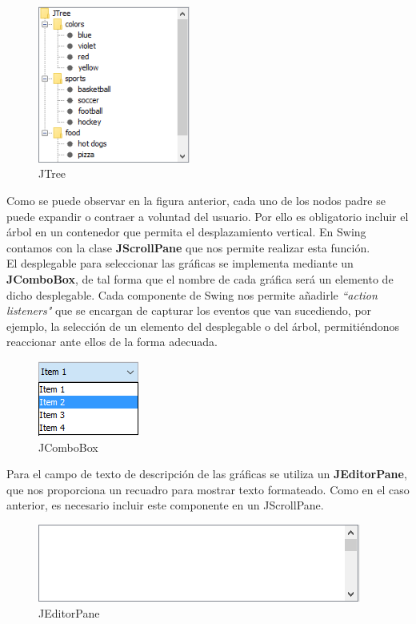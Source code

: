 \documentclass[12pt, a4paper]{article}
\begin{document}
\begin{figure}[htbp]
	\centering
	\includegraphics[width=5cm]{figuras/JTree.PNG}
	\caption{JTree}
	\label{fig:JTree}
	\end {figure}

Como se puede observar en la figura anterior, cada uno de los nodos padre se puede expandir o contraer a voluntad del usuario. Por ello es obligatorio incluir el árbol en un contenedor que permita el desplazamiento vertical. En Swing contamos con la clase \textbf{JScrollPane} que nos permite realizar esta función.
\\

El desplegable para seleccionar las gráficas se implementa mediante un \textbf{JComboBox}, de tal forma que el nombre de cada gráfica será un elemento de dicho desplegable. Cada componente de Swing nos permite añadirle \textit{``action listeners"} que se encargan de capturar los eventos que van sucediendo, por ejemplo, la selección de un elemento del desplegable o del árbol, permitiéndonos reaccionar ante ellos de la forma adecuada.

\begin{figure}[htbp]
	\centering
	\includegraphics{figuras/JComboBox.png}
	\caption{JComboBox}
	\label{fig:JComboBox}
	\end {figure}

Para el campo de texto de descripción de las gráficas se utiliza un \textbf{JEditorPane}, que nos proporciona un recuadro para mostrar texto formateado. Como en el caso anterior, es necesario incluir este componente en un JScrollPane.

\begin{figure}[htbp]
	\centering
	\includegraphics{figuras/JEditorPane.png}
	\caption{JEditorPane}
	\label{fig:JEditorPane}
	\end {figure}
\newpage
\end{document}
